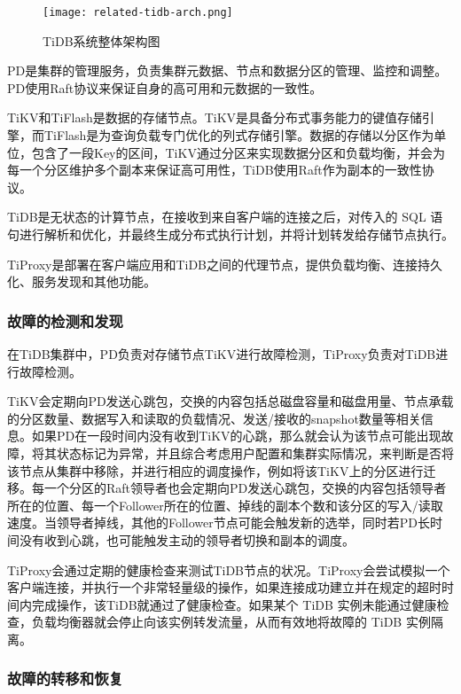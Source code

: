 \begin{figure}
  \centering
  \texttt{[image: related-tidb-arch.png]}
  \caption{TiDB系统整体架构图}
  \label{fig:tidb-arch}
\end{figure}

PD是集群的管理服务，负责集群元数据、节点和数据分区的管理、监控和调整。PD使用Raft协议来保证自身的高可用和元数据的一致性。

TiKV和TiFlash是数据的存储节点。TiKV是具备分布式事务能力的键值存储引擎，而TiFlash是为查询负载专门优化的列式存储引擎。数据的存储以分区作为单位，包含了一段Key的区间，TiKV通过分区来实现数据分区和负载均衡，并会为每一个分区维护多个副本来保证高可用性，TiDB使用Raft作为副本的一致性协议。

TiDB是无状态的计算节点，在接收到来自客户端的连接之后，对传入的 SQL 语句进行解析和优化，并最终生成分布式执行计划，并将计划转发给存储节点执行。

TiProxy是部署在客户端应用和TiDB之间的代理节点，提供负载均衡、连接持久化、服务发现和其他功能。


\subsubsection{故障的检测和发现}

在TiDB集群中，PD负责对存储节点TiKV进行故障检测，TiProxy负责对TiDB进行故障检测。

TiKV会定期向PD发送心跳包，交换的内容包括总磁盘容量和磁盘用量、节点承载的分区数量、数据写入和读取的负载情况、发送/接收的snapshot数量等相关信息。如果PD在一段时间内没有收到TiKV的心跳，那么就会认为该节点可能出现故障，将其状态标记为异常，并且综合考虑用户配置和集群实际情况，来判断是否将该节点从集群中移除，并进行相应的调度操作，例如将该TiKV上的分区进行迁移。每一个分区的Raft领导者也会定期向PD发送心跳包，交换的内容包括领导者所在的位置、每一个Follower所在的位置、掉线的副本个数和该分区的写入/读取速度。当领导者掉线，其他的Follower节点可能会触发新的选举，同时若PD长时间没有收到心跳，也可能触发主动的领导者切换和副本的调度。


TiProxy会通过定期的健康检查来测试TiDB节点的状况。TiProxy会尝试模拟一个客户端连接，并执行一个非常轻量级的操作，如果连接成功建立并在规定的超时时间内完成操作，该TiDB就通过了健康检查。如果某个 TiDB 实例未能通过健康检查，负载均衡器就会停止向该实例转发流量，从而有效地将故障的 TiDB 实例隔离。



\subsubsection{故障的转移和恢复}

